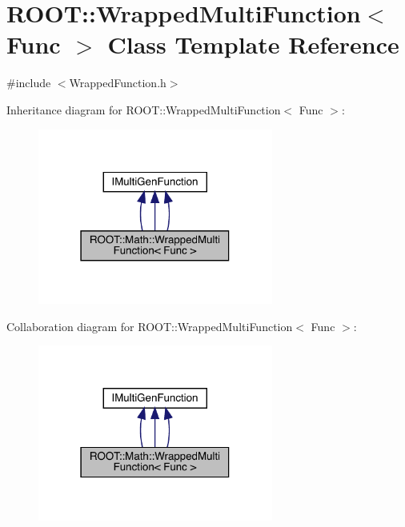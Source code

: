 \hypertarget{classROOT_1_1Math_1_1WrappedMultiFunction}{}\section{R\+O\+OT\+:\+:Wrapped\+Multi\+Function$<$ Func $>$ Class Template Reference}
\label{classROOT_1_1Math_1_1WrappedMultiFunction}


{\ttfamily \#include $<$Wrapped\+Function.\+h$>$}



Inheritance diagram for R\+O\+OT\+:\+:Wrapped\+Multi\+Function$<$ Func $>$\+:
\nopagebreak
\begin{figure}[H]
\begin{center}
\leavevmode
\includegraphics[width=219pt]{db/d4c/classROOT_1_1Math_1_1WrappedMultiFunction__inherit__graph}
\end{center}
\end{figure}


Collaboration diagram for R\+O\+OT\+:\+:Wrapped\+Multi\+Function$<$ Func $>$\+:
\nopagebreak
\begin{figure}[H]
\begin{center}
\leavevmode
\includegraphics[width=219pt]{dc/d27/classROOT_1_1Math_1_1WrappedMultiFunction__coll__graph}
\end{center}
\end{figure}
